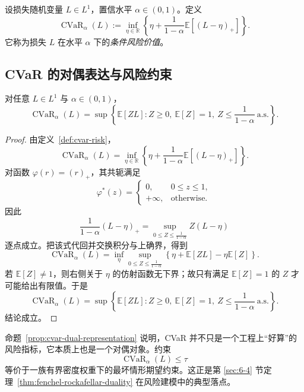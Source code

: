 \begin{definition}[CVaR]\label{def:cvar-risk}
设损失随机变量 $L\in L^1$，置信水平 $\alpha\in(0,1)$。定义
\[
\operatorname{CVaR}_\alpha(L)
:=
\inf_{\eta\in\mathbb R}
\left\{
\eta+\frac{1}{1-\alpha}\mathbb E[(L-\eta)_+]
\right\}.
\]
它称为损失 $L$ 在水平 $\alpha$ 下的\emph{条件风险价值}。
\end{definition}

\subsection{CVaR 的对偶表达与风险约束}

\begin{proposition}\label{prop:cvar-dual-representation}
对任意 $L\in L^1$ 与 $\alpha\in(0,1)$，
\[
\operatorname{CVaR}_\alpha(L)
=
\sup\left\{
\mathbb E[ZL]:
Z\ge 0,\ \mathbb E[Z]=1,\ Z\le \frac{1}{1-\alpha}\ \text{a.s.}
\right\}.
\]
\end{proposition}

\begin{proof}
由定义~\ref{def:cvar-risk}，
\[
\operatorname{CVaR}_\alpha(L)
=
\inf_{\eta\in\mathbb R}
\left\{
\eta+\frac{1}{1-\alpha}\mathbb E[(L-\eta)_+]
\right\}.
\]
对函数 $\varphi(r)=(r)_+$，其共轭满足
\[
\varphi^\ast(z)=
\begin{cases}
0, & 0\le z\le 1,\\
+\infty, & \text{otherwise}.
\end{cases}
\]
因此
\[
\frac{1}{1-\alpha}(L-\eta)_+
=
\sup_{0\le Z\le \frac{1}{1-\alpha}} Z(L-\eta)
\]
逐点成立。把该式代回并交换积分与上确界，得到
\[
\operatorname{CVaR}_\alpha(L)
=
\inf_{\eta}\sup_{0\le Z\le \frac{1}{1-\alpha}}
\left\{
\eta+\mathbb E[ZL]-\eta \mathbb E[Z]
\right\}.
\]
若 $\mathbb E[Z]\neq 1$，则右侧关于 $\eta$ 的仿射函数无下界；故只有满足 $\mathbb E[Z]=1$ 的 $Z$ 才可能给出有限值。于是
\[
\operatorname{CVaR}_\alpha(L)
=
\sup\left\{
\mathbb E[ZL]:
Z\ge 0,\ \mathbb E[Z]=1,\ Z\le \frac{1}{1-\alpha}\ \text{a.s.}
\right\}.
\]
结论成立。
\end{proof}

\begin{remark}
命题~\ref{prop:cvar-dual-representation} 说明，CVaR 并不只是一个工程上“好算”的风险指标，它本质上也是一个对偶对象。约束
\[
\operatorname{CVaR}_\alpha(L)\le \tau
\]
等价于一族有界密度权重下的最坏情形期望约束。这正是第 \ref{sec:6-4} 节定理~\ref{thm:fenchel-rockafellar-duality} 在风险建模中的典型落点。
\end{remark}

